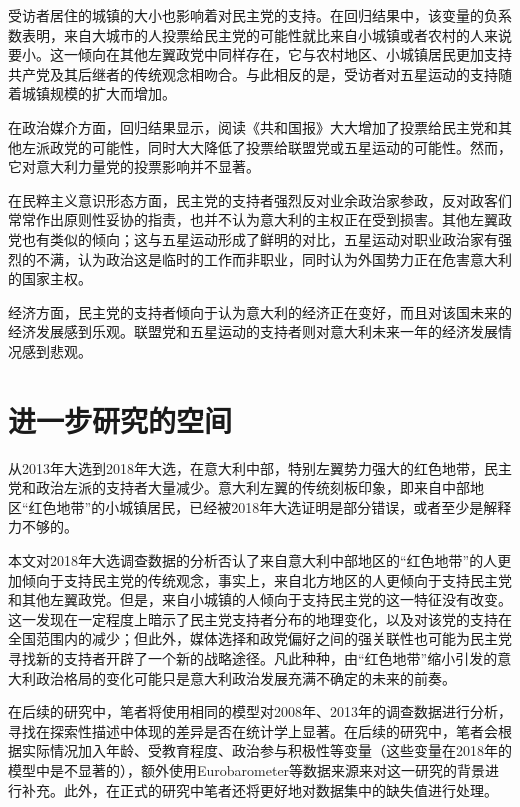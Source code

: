 \documentclass[12pt,a4paper]{ctexart}
\begin{document}
    受访者居住的城镇的大小也影响着对民主党的支持。在回归结果中，该变量的负系数表明，来自大城市的人投票给民主党的可能性就比来自小城镇或者农村的人来说要小。这一倾向在其他左翼政党中同样存在，它与农村地区、小城镇居民更加支持共产党及其后继者的传统观念相吻合。与此相反的是，受访者对五星运动的支持随着城镇规模的扩大而增加。

    在政治媒介方面，回归结果显示，阅读《共和国报》大大增加了投票给民主党和其他左派政党的可能性，同时大大降低了投票给联盟党或五星运动的可能性。然而，它对意大利力量党的投票影响并不显著。

    在民粹主义意识形态方面，民主党的支持者强烈反对业余政治家参政，反对政客们常常作出原则性妥协的指责，也并不认为意大利的主权正在受到损害。其他左翼政党也有类似的倾向；这与五星运动形成了鲜明的对比，五星运动对职业政治家有强烈的不满，认为政治这是临时的工作而非职业，同时认为外国势力正在危害意大利的国家主权。

    经济方面，民主党的支持者倾向于认为意大利的经济正在变好，而且对该国未来的经济发展感到乐观。联盟党和五星运动的支持者则对意大利未来一年的经济发展情况感到悲观。

    \section{进一步研究的空间}

    从2013年大选到2018年大选，在意大利中部，特别左翼势力强大的红色地带，民主党和政治左派的支持者大量减少。意大利左翼的传统刻板印象，即来自中部地区``红色地带''的小城镇居民，已经被2018年大选证明是部分错误，或者至少是解释力不够的。

    本文对2018年大选调查数据的分析否认了来自意大利中部地区的``红色地带''的人更加倾向于支持民主党的传统观念，事实上，来自北方地区的人更倾向于支持民主党和其他左翼政党。但是，来自小城镇的人倾向于支持民主党的这一特征没有改变。这一发现在一定程度上暗示了民主党支持者分布的地理变化，以及对该党的支持在全国范围内的减少；但此外，媒体选择和政党偏好之间的强关联性也可能为民主党寻找新的支持者开辟了一个新的战略途径。凡此种种，由``红色地带''缩小引发的意大利政治格局的变化可能只是意大利政治发展充满不确定的未来的前奏。

    在后续的研究中，笔者将使用相同的模型对2008年、2013年的调查数据进行分析，寻找在探索性描述中体现的差异是否在统计学上显著。在后续的研究中，笔者会根据实际情况加入年龄、受教育程度、政治参与积极性等变量（这些变量在2018年的模型中是不显著的），额外使用Eurobarometer等数据来源来对这一研究的背景进行补充。此外，在正式的研究中笔者还将更好地对数据集中的缺失值进行处理。

    
    
\end{document}
